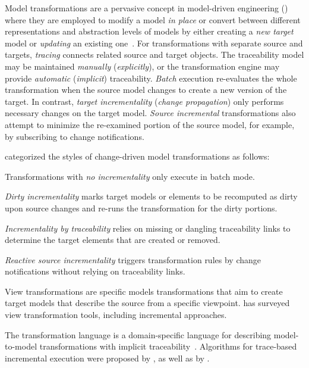 Model transformations are a pervasive concept in model-driven engineering () where they are employed to modify a model \emph{in place} or convert between different representations and abstraction levels of models by either creating a \emph{new target} model or \emph{updating} an existing one~\citep{Czarnecki06survey}. For transformations with separate source and targets, \emph{tracing} connects related source and target objects. The traceability model may be maintained \emph{manually} (\emph{explicitly}), or the transformation engine may provide \emph{automatic} (\emph{implicit}) traceability. \emph{Batch} execution re-evaluates the whole transformation when the source model changes to create a new version of the target. In contrast, \emph{target incrementality} (\emph{change propagation}) only performs necessary changes on the target model. \emph{Source incremental} transformations also attempt to minimize the re-examined portion of the source model, for example, by subscribing to change notifications.

\citet{Varro15styles} categorized the styles of change-driven model transformations as follows:
\begin{inparaenum}
\item Transformations with \emph{no incrementality} only execute in batch mode.
\item \emph{Dirty incrementality} marks target models or elements to be recomputed as dirty upon source changes and re-runs the transformation for the dirty portions.
\item \emph{Incrementality by traceability} relies on missing or dangling traceability links to determine the target elements that are created or removed.
\item \emph{Reactive source incrementality} triggers transformation rules by change notifications without relying on traceability links.
\end{inparaenum}

View transformations are specific models transformations that aim to create target models that describe the source from a specific viewpoint. \citet{Bruneliere17survey} has surveyed view transformation tools, including incremental approaches.

The  transformation language is a domain-specific language for describing model-to-model transformations with implicit traceability~\citep{Jouault08atl}. Algorithms for trace-based incremental  execution were proposed by \citet{Xiong07incremental}, as well as by \citet{Jouault10incremental}.

